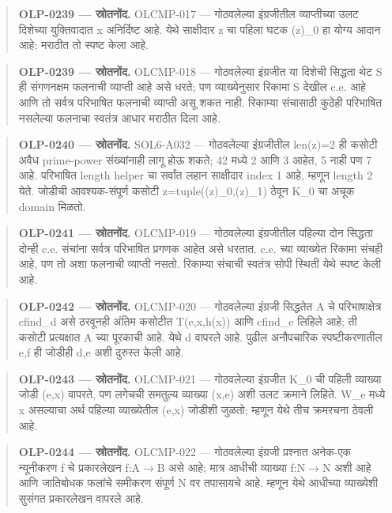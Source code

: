 \begin{quote}\small\textbf{OLP-0239 — स्रोतनोंद.} OLCMP-017 — गोठवलेल्या इंग्रजीतील व्याप्तीच्या उलट दिशेच्या युक्तिवादात x अनिर्दिष्ट आहे. येथे साक्षीदार z चा पहिला घटक (z)\_0 हा योग्य आदान आहे; मराठीत तो स्पष्ट केला आहे.\end{quote}
\begin{quote}\small\textbf{OLP-0239 — स्रोतनोंद.} OLCMP-018 — गोठवलेल्या इंग्रजीत या दिशेची सिद्धता थेट S ही संगणनक्षम फलनाची व्याप्ती आहे असे धरते; पण व्याख्येनुसार रिकामा S देखील c.e. आहे आणि तो सर्वत्र परिभाषित फलनाची व्याप्ती असू शकत नाही. रिकाम्या संचासाठी कुठेही परिभाषित नसलेल्या फलनाचा स्वतंत्र आधार मराठीत दिला आहे.\end{quote}
\begin{quote}\small\textbf{OLP-0240 — स्रोतनोंद.} SOL6-A032 — गोठवलेल्या इंग्रजीतील len(z)=2 ही कसोटी अवैध prime-power संख्यांनाही लागू होऊ शकते; 42 मध्ये 2 आणि 3 आहेत, 5 नाही पण 7 आहे. परिभाषित length helper चा सर्वांत लहान साक्षीदार index 1 आहे, म्हणून length 2 येते. जोडीची आवश्यक-संपूर्ण कसोटी z=tuple((z)\_0,(z)\_1) ठेवून K\_0 चा अचूक domain मिळतो.\end{quote}
\begin{quote}\small\textbf{OLP-0241 — स्रोतनोंद.} OLCMP-019 — गोठवलेल्या इंग्रजीतील पहिल्या दोन सिद्धता दोन्ही c.e. संचांना सर्वत्र परिभाषित प्रगणक आहेत असे धरतात. c.e. च्या व्याख्येत रिकामा संचही आहे, पण तो अशा फलनाची व्याप्ती नसतो. रिकाम्या संचाची स्वतंत्र सोपी स्थिती येथे स्पष्ट केली आहे.\end{quote}
\begin{quote}\small\textbf{OLP-0242 — स्रोतनोंद.} OLCMP-020 — गोठवलेल्या इंग्रजी सिद्धतेत A चे परिभाषाक्षेत्र cfind\_d असे ठरवूनही अंतिम कसोटीत T(e,x,h(x)) आणि cfind\_e लिहिले आहे; ती कसोटी प्रत्यक्षात A च्या पूरकाची आहे. येथे d वापरले आहे. पुढील अनौपचारिक स्पष्टीकरणातील e,f ही जोडीही d,e अशी दुरुस्त केली आहे.\end{quote}
\begin{quote}\small\textbf{OLP-0243 — स्रोतनोंद.} OLCMP-021 — गोठवलेल्या इंग्रजीत K\_0 ची पहिली व्याख्या जोडी (e,x) वापरते, पण लगेचची समतुल्य व्याख्या (x,e) अशी उलट क्रमाने लिहिते. W\_e मध्ये x असल्याचा अर्थ पहिल्या व्याख्येतील (e,x) जोडीशी जुळतो; म्हणून येथे तीच क्रमरचना ठेवली आहे.\end{quote}
\begin{quote}\small\textbf{OLP-0244 — स्रोतनोंद.} OLCMP-022 — गोठवलेल्या इंग्रजी प्रश्नात अनेक-एक न्यूनीकरण f चे प्रकारलेखन f:A\ensuremath{\to}B असे आहे; मात्र आधीची व्याख्या f:N\ensuremath{\to}N अशी आहे आणि जातिबोधक फलांचे समीकरण संपूर्ण N वर तपासायचे आहे. म्हणून येथे आधीच्या व्याख्येशी सुसंगत प्रकारलेखन वापरले आहे.\end{quote}
